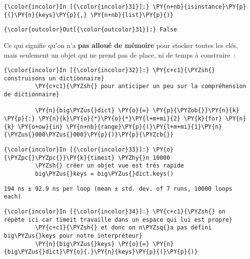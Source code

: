     \begin{Verbatim}[commandchars=\\\{\}]
{\color{incolor}In [{\color{incolor}31}]:} \PY{n+nb}{isinstance}\PY{p}{(}\PY{n}{keys}\PY{p}{,} \PY{n+nb}{list}\PY{p}{)}
\end{Verbatim}


\begin{Verbatim}[commandchars=\\\{\}]
{\color{outcolor}Out[{\color{outcolor}31}]:} False
\end{Verbatim}
            
    Ce qui signifie qu'on n'a \textbf{pas alloué de mémoire} pour stocker
toutes les clés, mais seulement un objet qui ne prend pas de place, ni
de temps à construire~:

    \begin{Verbatim}[commandchars=\\\{\}]
{\color{incolor}In [{\color{incolor}32}]:} \PY{c+c1}{\PYZsh{} construisons un dictionnaire}
         \PY{c+c1}{\PYZsh{} pour anticiper un peu sur la compréhension de dictionnaire}
         
         \PY{n}{big\PYZus{}dict} \PY{o}{=} \PY{p}{\PYZob{}}\PY{n}{k} \PY{p}{:} \PY{n}{k}\PY{o}{*}\PY{o}{*}\PY{l+m+mi}{2} \PY{k}{for} \PY{n}{k} \PY{o+ow}{in} \PY{n+nb}{range}\PY{p}{(}\PY{l+m+mi}{1}\PY{n}{\PYZus{}000\PYZus{}000}\PY{p}{)}\PY{p}{\PYZcb{}}
\end{Verbatim}


    \begin{Verbatim}[commandchars=\\\{\}]
{\color{incolor}In [{\color{incolor}33}]:} \PY{o}{\PYZpc{}\PYZpc{}}\PY{k}{timeit} \PYZhy{}n 10000
         \PYZsh{} créer un objet vue est très rapide
         big\PYZus{}keys = big\PYZus{}dict.keys()
\end{Verbatim}


    \begin{Verbatim}[commandchars=\\\{\}]
194 ns ± 92.9 ns per loop (mean ± std. dev. of 7 runs, 10000 loops each)

    \end{Verbatim}

    \begin{Verbatim}[commandchars=\\\{\}]
{\color{incolor}In [{\color{incolor}34}]:} \PY{c+c1}{\PYZsh{} on répète ici car timeit travaille dans un espace qui lui est propre}
         \PY{c+c1}{\PYZsh{} et donc on n\PYZsq{}a pas défini big\PYZus{}keys pour notre interpréteur}
         \PY{n}{big\PYZus{}keys} \PY{o}{=} \PY{n}{big\PYZus{}dict}\PY{o}{.}\PY{n}{keys}\PY{p}{(}\PY{p}{)}
\end{Verbatim}


